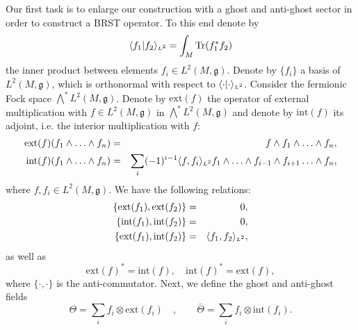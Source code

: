 \documentclass[letterpaper,11pt]{article}
\newcommand{\nn}{\nonumber}
\def\d{\delta}
\begin{document}
Our first task is to enlarge our construction with a ghost and anti-ghost sector in order to construct a BRST operator. To this end
denote by 
$$
\langle f_1 \vert f_2 \rangle_{\mbox{\tiny $L^2$}} = \int_M \mbox{Tr}(f_1^* f_2)
$$ the inner product between elements $f_i\in L^2(M,\mathfrak{g})$. Denote by $\{f_i\}$ a basis of $ L^2(M,\mathfrak{g})$, which is orthonormal with respect to $\langle \cdot \vert \cdot \rangle_{\mbox{\tiny $L^2$}}$. Consider the fermionic Fock space $\bigwedge^* L^2(M,\mathfrak{g})$. Denote by $\mbox{ext}(f)$ the operator of external multiplication with $f\in L^2(M,\mathfrak{g})$ in $\bigwedge^* L^2(M,\mathfrak{g})$ and 
denote by $\mbox{int}(f)$ its adjoint, i.e. the interior multiplication with $f$:
\begin{eqnarray}
\mbox{ext}(f) (f_1 \wedge  \ldots \wedge f_n) &=&  f\wedge f_1 \wedge  \ldots \wedge f_n,
\nn\\
\mbox{int} (f) (f_1 \wedge  \ldots \wedge f_n) &=& \sum_i (-1)^{i-1} \langle f, f_i \rangle_{\mbox{\tiny $L^2$}} f_1 \wedge \ldots \wedge f_{i-1} \wedge f_{i+1} \ldots \wedge f_n,
\nn
\end{eqnarray}
where $f, f_i\in L^2(M, \mathfrak{g})$. We have the following relations:
\begin{eqnarray}
\{\mbox{ext}(f_1), \mbox{ext}(f_2)  \} &=& 0,
\nn\\
\{\mbox{int}(f_1), \mbox{int}(f_2)  \} &=& 0,
\nn\\
\{\mbox{ext}(f_1), \mbox{int}(f_2)  \} &=& \langle f_1, f_2 \rangle_{\mbox{\tiny $L^2$}}  ,
\end{eqnarray}
as well as
$$
\mbox{ext}(f)^* = \mbox{int}(f),\quad \mbox{int}(f)^* = \mbox{ext}(f),
$$
where $\{\cdot,\cdot\}$ is the anti-commutator. 
Next, we define the ghost and anti-ghost fields
$$
\Theta = \sum_i f_i \otimes\mbox{ext}(f_i)\quad,\qquad \bar{\Theta} = \sum_i f_i \otimes \mbox{int}(f_i).
$$
\end{document}

